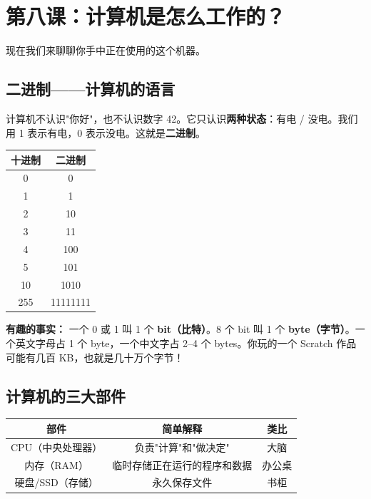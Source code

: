 \documentclass[a4paper,12pt]{ctexart}
\begin{document}
\section*{第八课：计算机是怎么工作的？}

现在我们来聊聊你手中正在使用的这个机器。

\subsection*{二进制——计算机的语言}

计算机不认识"你好"，也不认识数字 42。它只认识\textbf{两种状态}：有电 / 没电。我们用 1 表示有电，0 表示没电。这就是\textbf{二进制}。

\begin{center}
\begin{tabular}{|c|c|}
\hline
\textbf{十进制} & \textbf{二进制} \\ \hline
0 & 0 \\ \hline
1 & 1 \\ \hline
2 & 10 \\ \hline
3 & 11 \\ \hline
4 & 100 \\ \hline
5 & 101 \\ \hline
10 & 1010 \\ \hline
255 & 11111111 \\ \hline
\end{tabular}
\end{center}

\textbf{有趣的事实：} 一个 0 或 1 叫 1 个 \textbf{bit（比特）}。8 个 bit 叫 1 个 \textbf{byte（字节）}。一个英文字母占 1 个 byte，一个中文字占 2--4 个 bytes。你玩的一个 Scratch 作品可能有几百 KB，也就是几十万个字节！

\subsection*{计算机的三大部件}

\begin{center}
\begin{tabular}{|c|c|c|}
\hline
\textbf{部件} & \textbf{简单解释} & \textbf{类比} \\ \hline
CPU（中央处理器） & 负责"计算"和"做决定" & 大脑 \\ \hline
内存（RAM） & 临时存储正在运行的程序和数据 & 办公桌 \\ \hline
硬盘/SSD（存储） & 永久保存文件 & 书柜 \\ \hline
\end{tabular}
\end{center}
\end{document}
